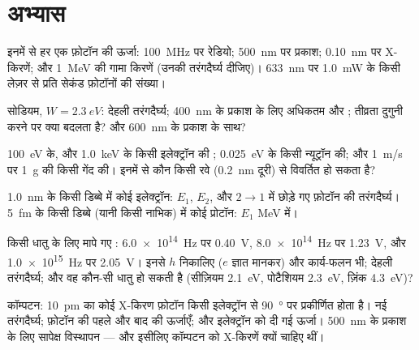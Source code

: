\section{अभ्यास}

\begin{exercise}[$\star$]\label{exo:b1:quantum-introduction:1}
इनमें से हर एक फ़ोटॉन की ऊर्जा: \qty{100}{MHz} पर रेडियो; \qty{500}{nm} पर
प्रकाश; \qty{0.10}{nm} पर X-किरणें; और \qty{1}{MeV} की गामा किरणें (उनकी
तरंगदैर्घ्य दीजिए)। \qty{633}{nm} पर \qty{1.0}{mW} के किसी लेज़र से प्रति
सेकंड फ़ोटॉनों की संख्या।
\end{exercise}

\begin{exercise}[$\star$]\label{exo:b1:quantum-introduction:2}
सोडियम, $W = \qty{2.3}{eV}$: देहली तरंगदैर्घ्य; \qty{400}{nm} के प्रकाश के
लिए अधिकतम  और ; तीव्रता दुगुनी करने पर क्या बदलता
है? और \qty{600}{nm} के प्रकाश के साथ?
\end{exercise}

\begin{exercise}[$\star$]\label{exo:b1:quantum-introduction:3}
\qty{100}{eV} के, और \qty{1.0}{keV} के किसी इलेक्ट्रॉन की ; \qty{0.025}{eV} के किसी न्यूट्रॉन की; और \qty{1}{m/s} पर
\qty{1}{g} की किसी गेंद की। इनमें से कौन किसी रवे (\qty{0.2}{nm} दूरी) से
विवर्तित हो सकता है?
\end{exercise}

\begin{exercise}[$\star$]\label{exo:b1:quantum-introduction:4}
\qty{1.0}{nm} के किसी डिब्बे में कोई इलेक्ट्रॉन: $E_1$, $E_2$, और
$2 \to 1$ में छोड़े गए फ़ोटॉन की तरंगदैर्घ्य। \qty{5}{fm} के किसी डिब्बे
(यानी किसी नाभिक) में कोई प्रोटॉन: $E_1$ \unit{MeV} में।
\end{exercise}

\begin{exercise}[$\star\star$]\label{exo:b1:quantum-introduction:5}
किसी धातु के लिए मापे गए : \qty{6.0e14}{Hz} पर \qty{0.40}{V},
\qty{8.0e14}{Hz} पर \qty{1.23}{V}, और \qty{1.0e15}{Hz} पर \qty{2.05}{V}।
इनसे $h$ निकालिए ($e$ ज्ञात मानकर) और कार्य-फलन भी; देहली तरंगदैर्घ्य; और
वह कौन-सी धातु हो सकती है (सीज़ियम \qty{2.1}{eV},
पोटैशियम \qty{2.3}{eV}, ज़िंक \qty{4.3}{eV})?
\end{exercise}

\begin{exercise}[$\star\star$]\label{exo:b1:quantum-introduction:6}
कॉम्पटन: \qty{10}{pm} का कोई X-किरण फ़ोटॉन किसी इलेक्ट्रॉन से
\qty{90}{\degree} पर प्रकीर्णित होता है। नई तरंगदैर्घ्य; फ़ोटॉन की पहले और
बाद की ऊर्जाएँ; और इलेक्ट्रॉन को दी गई ऊर्जा। \qty{500}{nm} के प्रकाश के
लिए सापेक्ष विस्थापन --- और इसीलिए कॉम्पटन को X-किरणें क्यों चाहिए थीं।
\end{exercise}

